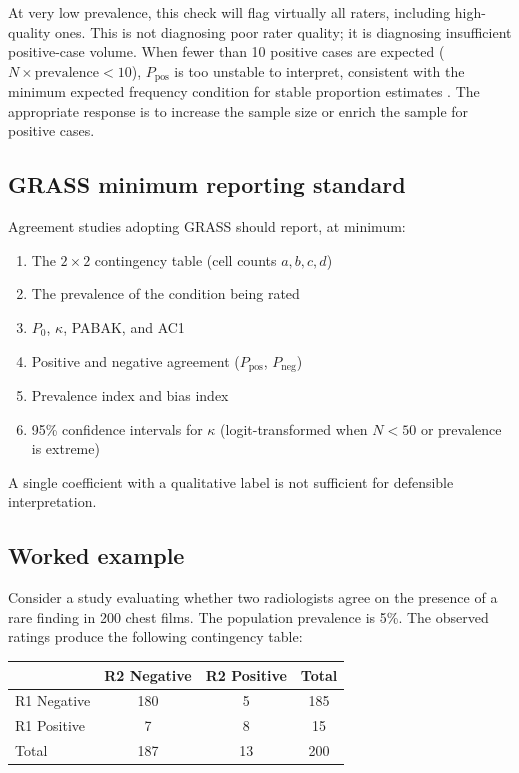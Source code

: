 \documentclass[11pt]{article}
\begin{document}
At very low prevalence, this check will flag virtually all raters, including high-quality ones. This is not diagnosing poor rater quality; it is diagnosing insufficient positive-case volume. When fewer than 10 positive cases are expected ($N \times \text{prevalence} < 10$), $P_{\text{pos}}$ is too unstable to interpret, consistent with the minimum expected frequency condition for stable proportion estimates \citep{cochran1952chisquare, agresti2002categorical}. The appropriate response is to increase the sample size or enrich the sample for positive cases.

\subsection*{GRASS minimum reporting standard}

Agreement studies adopting GRASS should report, at minimum:
\begin{enumerate}
\item The $2 \times 2$ contingency table (cell counts $a, b, c, d$)
\item The prevalence of the condition being rated
\item $P_0$, $\kappa$, PABAK, and AC1
\item Positive and negative agreement ($P_{\text{pos}}$, $P_{\text{neg}}$)
\item Prevalence index and bias index
\item 95\% confidence intervals for $\kappa$ (logit-transformed when $N < 50$ or prevalence is extreme)
\end{enumerate}

A single coefficient with a qualitative label is not sufficient for defensible interpretation.

\subsection*{Worked example}

Consider a study evaluating whether two radiologists agree on the presence of a rare finding in 200 chest films. The population prevalence is 5\%. The observed ratings produce the following contingency table:

\begin{table}[h!]
\centering
\begin{tabular}{lcc||c}
\toprule
 & R2 Negative & R2 Positive & Total \\
\midrule
R1 Negative & 180 & 5 & 185 \\
R1 Positive & 7 & 8 & 15 \\
\midrule\midrule
Total & 187 & 13 & 200 \\
\bottomrule
\end{tabular}
\end{table}
\end{document}
